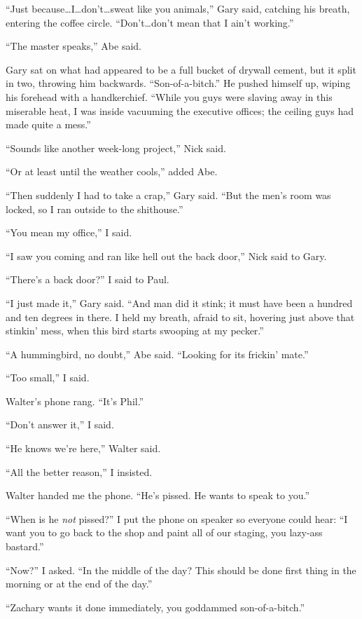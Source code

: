 ``Just because\ldots I\ldots don't\ldots sweat like you animals,'' Gary
said, catching his breath, entering the coffee circle.
``Don't\ldots don't mean that I ain't working.''

``The master speaks,'' Abe said.

Gary sat on what had appeared to be a full bucket of drywall cement, but
it split in two, throwing him backwards. ``Son-of-a-bitch.'' He pushed
himself up, wiping his forehead with a handkerchief. ``While you guys
were slaving away in this miserable heat, I was inside vacuuming the
executive offices; the ceiling guys had made quite a mess.''

``Sounds like another week-long project,'' Nick said.

``Or at least until the weather cools,'' added Abe.

``Then suddenly I had to take a crap,'' Gary said. ``But the men's room
was locked, so I ran outside to the shithouse.''

``You mean my office,'' I said.

``I saw you coming and ran like hell out the back door,'' Nick said to
Gary.

``There's a back door?'' I said to Paul.

``I just made it,'' Gary said. ``And man did it stink; it must have been
a hundred and ten degrees in there. I held my breath, afraid to sit,
hovering just above that stinkin' mess, when this bird starts swooping
at my pecker.''

``A hummingbird, no doubt,'' Abe said. ``Looking for its frickin'
mate.''

``Too small,'' I said.

Walter's phone rang. ``It's Phil.''

``Don't answer it,'' I said.

``He knows we're here,'' Walter said.

``All the better reason,'' I insisted.

Walter handed me the phone. ``He's pissed. He wants to speak to you.''

``When is he \emph{not} pissed?'' I put the phone on speaker so everyone
could hear: ``I want you to go back to the shop and paint all of our
staging, you lazy-ass bastard.''

``Now?'' I asked. ``In the middle of the day? This should be done first
thing in the morning or at the end of the day.''

``Zachary wants it done immediately, you goddammed son-of-a-bitch.''

